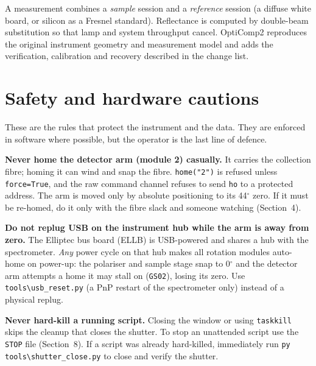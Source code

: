 \documentclass[11pt]{article}
\newcommand{\code}[1]{\texttt{\small #1}}
\begin{document}
A measurement combines a \emph{sample} session and a \emph{reference} session (a diffuse white board,
or silicon as a Fresnel standard). Reflectance is computed by double-beam substitution so that lamp
and system throughput cancel. OptiComp2 reproduces the original instrument geometry and measurement
model and adds the verification, calibration and recovery described in the change list.

\section{Safety and hardware cautions}

These are the rules that protect the instrument and the data. They are enforced in software where
possible, but the operator is the last line of defence.

\begin{cautionbox}
\textbf{Never home the detector arm (module 2) casually.} It carries the collection fibre; homing it
can wind and snap the fibre. \code{home("2")} is refused unless \code{force=True}, and the raw command
channel refuses to send \code{ho} to a protected address. The arm is moved only by absolute
positioning to its 44$^\circ$ zero. If it must be re-homed, do it only with the fibre slack and
someone watching (Section~4).
\end{cautionbox}

\begin{cautionbox}
\textbf{Do not replug USB on the instrument hub while the arm is away from zero.} The Elliptec bus
board (ELLB) is USB-powered and shares a hub with the spectrometer. \emph{Any} power cycle on that hub
makes all rotation modules auto-home on power-up: the polariser and sample stage snap to 0$^\circ$ and
the detector arm attempts a home it may stall on (\code{GS02}), losing its zero. Use
\code{tools\textbackslash usb\_reset.py} (a PnP restart of the spectrometer only) instead of a
physical replug.
\end{cautionbox}

\begin{cautionbox}
\textbf{Never hard-kill a running script.} Closing the window or using \code{taskkill} skips the
cleanup that closes the shutter. To stop an unattended script use the \code{STOP} file
(Section~8). If a script was already hard-killed, immediately run
\code{py tools\textbackslash shutter\_close.py} to close and verify the shutter.
\end{cautionbox}
\end{document}
